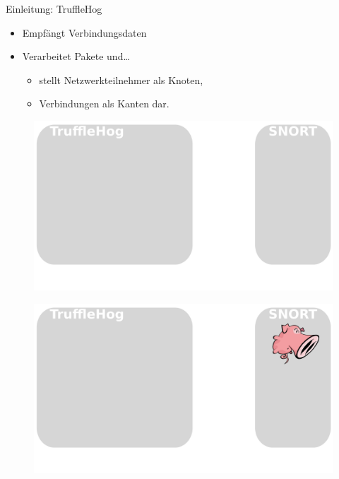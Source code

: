 \documentclass[18pt]{beamer}
\begin{document}
\begin{frame}{Einleitung: TruffleHog}
    \begin{itemize}
      \item Empfängt Verbindungsdaten
      \pause
      \item Verarbeitet Pakete und\dots
      \pause
      \begin{itemize}
        \item stellt Netzwerkteilnehmer als Knoten, \pause
        \item Verbindungen als Kanten dar. 
      \end{itemize}
    \end{itemize}
\end{frame}


\begin{frame}
    \begin{figure}
    	\centering
    	\includegraphics[width=\textwidth]{./images/jan_1.png}
    \end{figure}
\end{frame}

\begin{frame}
    \begin{figure}
    	\centering
    	\includegraphics[width=\textwidth]{./images/jan_2.png}
    \end{figure}
\end{frame}
\end{document}
